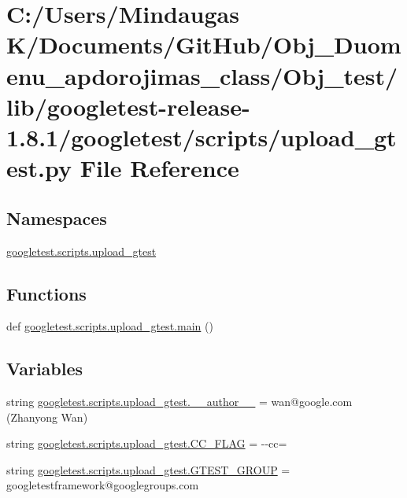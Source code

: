 \hypertarget{_obj__test_2lib_2googletest-release-1_88_81_2googletest_2scripts_2upload__gtest_8py}{}\section{C\+:/\+Users/\+Mindaugas K/\+Documents/\+Git\+Hub/\+Obj\+\_\+\+Duomenu\+\_\+apdorojimas\+\_\+class/\+Obj\+\_\+test/lib/googletest-\/release-\/1.8.1/googletest/scripts/upload\+\_\+gtest.py File Reference}
\label{_obj__test_2lib_2googletest-release-1_88_81_2googletest_2scripts_2upload__gtest_8py}
\subsection*{Namespaces}
\begin{DoxyCompactItemize}
\item 
 \mbox{\hyperlink{namespacegoogletest_1_1scripts_1_1upload__gtest}{googletest.\+scripts.\+upload\+\_\+gtest}}
\end{DoxyCompactItemize}
\subsection*{Functions}
\begin{DoxyCompactItemize}
\item 
def \mbox{\hyperlink{namespacegoogletest_1_1scripts_1_1upload__gtest_ab2cfb3d877cd780bf82d715b56efc9a8}{googletest.\+scripts.\+upload\+\_\+gtest.\+main}} ()
\end{DoxyCompactItemize}
\subsection*{Variables}
\begin{DoxyCompactItemize}
\item 
string \mbox{\hyperlink{namespacegoogletest_1_1scripts_1_1upload__gtest_a14f57871ae0851dab49635e3524d9dd7}{googletest.\+scripts.\+upload\+\_\+gtest.\+\_\+\+\_\+author\+\_\+\+\_\+}} = \textquotesingle{}wan@google.\+com (Zhanyong Wan)\textquotesingle{}
\item 
string \mbox{\hyperlink{namespacegoogletest_1_1scripts_1_1upload__gtest_a76fe5d4decd1d821b3be7ad0cb53ab95}{googletest.\+scripts.\+upload\+\_\+gtest.\+C\+C\+\_\+\+F\+L\+AG}} = \textquotesingle{}-\/-\/cc=\textquotesingle{}
\item 
string \mbox{\hyperlink{namespacegoogletest_1_1scripts_1_1upload__gtest_aeab70fa3638847e87bb2ba053cc14107}{googletest.\+scripts.\+upload\+\_\+gtest.\+G\+T\+E\+S\+T\+\_\+\+G\+R\+O\+UP}} = \textquotesingle{}googletestframework@googlegroups.\+com\textquotesingle{}
\end{DoxyCompactItemize}
